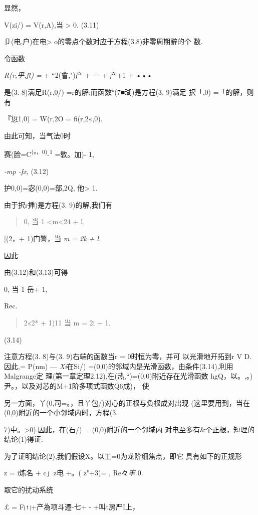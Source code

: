 \documentclass{article}
\begin{document}
显然，

V(zi/) = V(r,A),当 \textgreater{} 0. (3.11)

卩(电,户)在电\textgreater{} o的零点个数对应于方程(3.8)非零周期辭的个 数.

令函数

\emph{R(r,乎,ft) =} + ``2(會,")产 + ― + 产+1 + •••

是(3. 8)满足R(r,0/) =r的解;而函数°(7■瑚)是方程(3. 9)满足 択「,0)
=「的解，则有

『愆1,0) = W(r,2O = fi(r,2«,0).

由此可知，当气法0时

赛(脸=C\textsuperscript{(}°\textsuperscript{，0)}-\textsuperscript{1}
=敎。加)- 1,

\emph{-mp -fx,} (3.12)

护0,0)=宓(0,0)=部,2Q, 他\textgreater{} 1.

由于択r挿)是方程(3. 9)的解,我们有

\begin{quote}
0, 当 1 \textless{}m\textless{}24 + l,
\end{quote}

{[}(2，+ 1)门警，当 \emph{m = 2k + l.}

因此

由(3.12)和(3.13)可得

0, 当 1 岳+ 1,

Rec.

\begin{quote}
2«2* + 1)11 当 m = 2i + 1.
\end{quote}

(3.14)

注意方程(3. 8)与(3. 9)右端的函数当r = 0时恒为零，并可 以光滑地开拓到r V
D.因此,= P(nm) --- \emph{Xi}在Si/)
=(0,0)的邻域内是光滑函数，由条件(3.14),利用Malgrange定
理(第一章定理2.12),在(热,``)=(0,0)附近存在光滑函数
hgQ，以。,。)尹。，以及对芯的M+1阶多项式函数Q6成)， 使

另一方面，丫(0,司=。，且丫包\textbar{}/)对心的正根与负根成对出现
(这里要用到，当在(0,0)附近的一个小邻域内时，方程(3.

7)中。\textgreater{}0).因此，在(石/) = (0,0)附近的一个邻域内
对电至多有\&个正根，短理的结论(1)得证.

为了证明结论(2),我们假设X。以工=0为龙阶细焦点，即它 具有如下的正规形

z = i炼名 + c」z\textbar{}电 +。( \textbar{}z\textbar{}"+3)= ,
Re々\emph{丰} 0.

取它的扰动系统

£ = F⑴+产為项斗遷-七+ - +叫t房严I上，
\end{document}
